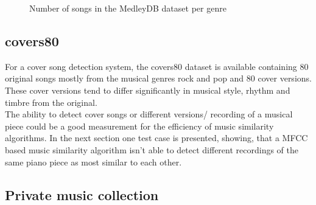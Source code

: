 \begin{figure}[thpb]
	\centering
	\caption{Number of songs in the MedleyDB dataset per genre}
	\label{medleydbdist}
\end{figure}
\FloatBarrier

\subsection{covers80}

For a cover song detection system, the covers80 dataset is available \cite{cover80} containing 80 original songs mostly from the musical genres rock and pop and 80 cover versions. These cover versions tend to differ significantly in musical style, rhythm and timbre from the original.\\
The ability to detect cover songs or different versions/ recording of a musical piece could be a good measurement for the efficiency of music similarity algorithms. In the next section one test case is presented, showing, that a MFCC based music similarity algorithm isn't able to detect different recordings of the same piano piece as most similar to each other. 

\subsection{Private music collection}

